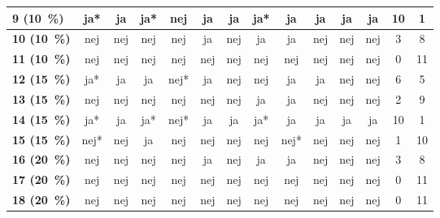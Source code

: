 \begin{longtable} {|l|c|c|c|c|c|c|c|c|c|c|c|c|c|}
\cellcolor[HTML]{C0C0C0}\textbf{9    (10~\%)}	& ja* 	& ja  &	ja*  & \cellcolor[HTML]{32CB00}nej   & ja  & ja  &ja*   &ja &ja &ja &ja & \cellcolor[HTML]{EFEFEF}10 & \cellcolor[HTML]{EFEFEF}1 \\ \hline
\cellcolor[HTML]{C0C0C0}\textbf{10 (10~\%)}	&nej &nej &nej&	nej	&ja	&nej&	ja&	ja&	nej&	nej&nej & \cellcolor[HTML]{EFEFEF}3 & \cellcolor[HTML]{EFEFEF}8 \\ \hline
\cellcolor[HTML]{C0C0C0}\textbf{11   (10~\%)}	 & \cellcolor[HTML]{34CDF9} nej	& \cellcolor[HTML]{34CDF9}nej &	\cellcolor[HTML]{34CDF9}nej &\cellcolor[HTML]{34CDF9} nej	& \cellcolor[HTML]{34CDF9}nej &	\cellcolor[HTML]{34CDF9}nej	& \cellcolor[HTML]{34CDF9}nej & \cellcolor[HTML]{34CDF9}nej	& \cellcolor[HTML]{34CDF9}nej	& \cellcolor[HTML]{34CDF9}nej	& \cellcolor[HTML]{34CDF9}nej & \cellcolor[HTML]{EFEFEF}0 & \cellcolor[HTML]{EFEFEF}11\\ \hline 
\cellcolor[HTML]{C0C0C0}\textbf{12 (15~\%)}	&ja*&	ja&	ja&	nej*&	ja&	nej&	nej&	ja&	ja&	nej&	nej & \cellcolor[HTML]{EFEFEF}6 & \cellcolor[HTML]{EFEFEF}5 \\ \hline
\cellcolor[HTML]{C0C0C0}\textbf{13 (15~\%)}	&nej&	nej&	nej&	nej&	nej&	nej& 	ja&	ja&	nej&	nej&	nej & \cellcolor[HTML]{EFEFEF}2 & \cellcolor[HTML]{EFEFEF}9\\ \hline
\cellcolor[HTML]{C0C0C0}\textbf{14 (15~\%)}&ja*&	ja&	ja*& \cellcolor[HTML]{32CB00}nej*&	ja&	ja&	ja*&	ja&	ja&	ja&	ja &\cellcolor[HTML]{EFEFEF}10 &\cellcolor[HTML]{EFEFEF}1
\\ \hline
\cellcolor[HTML]{C0C0C0}\textbf{15 (15~\%)}	& nej* & nej & \cellcolor[HTML]{32CB00}ja & nej & nej & nej &	nej & nej* & nej & nej & nej & \cellcolor[HTML]{EFEFEF}1 & \cellcolor[HTML]{EFEFEF}10 \\ \hline
\cellcolor[HTML]{C0C0C0}\textbf{16 (20~\%)}	& nej & nej & nej & nej & ja & nej & ja & ja & nej & nej & nej & \cellcolor[HTML]{EFEFEF}3 & \cellcolor[HTML]{EFEFEF}8 \\ \hline
\cellcolor[HTML]{C0C0C0}\textbf{17 (20~\%)} & \cellcolor[HTML]{34CDF9} nej	& \cellcolor[HTML]{34CDF9}nej &	\cellcolor[HTML]{34CDF9}nej &\cellcolor[HTML]{34CDF9} nej	& \cellcolor[HTML]{34CDF9}nej &	\cellcolor[HTML]{34CDF9}nej	& \cellcolor[HTML]{34CDF9}nej & \cellcolor[HTML]{34CDF9}nej	& \cellcolor[HTML]{34CDF9}nej	& \cellcolor[HTML]{34CDF9}nej	& \cellcolor[HTML]{34CDF9}nej & \cellcolor[HTML]{EFEFEF}0 & \cellcolor[HTML]{EFEFEF}11\\ \hline 
\cellcolor[HTML]{C0C0C0}\textbf{18 (20~\%)}	& \cellcolor[HTML]{34CDF9} nej	& \cellcolor[HTML]{34CDF9}nej &	\cellcolor[HTML]{34CDF9}nej &\cellcolor[HTML]{34CDF9} nej	& \cellcolor[HTML]{34CDF9}nej &	\cellcolor[HTML]{34CDF9}nej	& \cellcolor[HTML]{34CDF9}nej & \cellcolor[HTML]{34CDF9}nej	& \cellcolor[HTML]{34CDF9}nej	& \cellcolor[HTML]{34CDF9}nej	& \cellcolor[HTML]{34CDF9}nej & \cellcolor[HTML]{EFEFEF}0 & \cellcolor[HTML]{EFEFEF}11\\ \hline 

\end{longtable}
